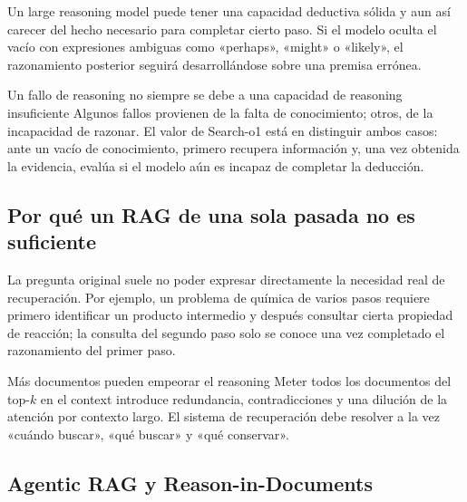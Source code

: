\documentclass[a4paper]{article}
\begin{document}
Un large reasoning model puede tener una capacidad deductiva sólida y aun así carecer del hecho necesario para completar cierto paso. Si el modelo oculta el vacío con expresiones ambiguas como «perhaps», «might» o «likely», el razonamiento posterior seguirá desarrollándose sobre una premisa errónea.

\begin{importantbox}{Un fallo de reasoning no siempre se debe a una capacidad de reasoning insuficiente}
Algunos fallos provienen de la falta de conocimiento; otros, de la incapacidad de razonar. El valor de Search-o1 está en distinguir ambos casos: ante un vacío de conocimiento, primero recupera información y, una vez obtenida la evidencia, evalúa si el modelo aún es incapaz de completar la deducción.
\end{importantbox}

\subsection{Por qué un RAG de una sola pasada no es suficiente}


La pregunta original suele no poder expresar directamente la necesidad real de recuperación. Por ejemplo, un problema de química de varios pasos requiere primero identificar un producto intermedio y después consultar cierta propiedad de reacción; la consulta del segundo paso solo se conoce una vez completado el razonamiento del primer paso.

\begin{warningbox}{Más documentos pueden empeorar el reasoning}
Meter todos los documentos del top-$k$ en el context introduce redundancia, contradicciones y una dilución de la atención por contexto largo. El sistema de recuperación debe resolver a la vez «cuándo buscar», «qué buscar» y «qué conservar».
\end{warningbox}

\subsection{Agentic RAG y Reason-in-Documents}

\end{document}
